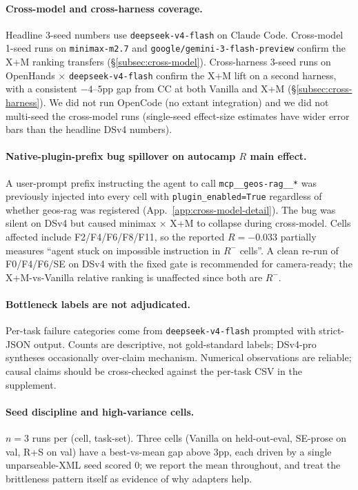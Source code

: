 \documentclass{article}
\begin{document}
\paragraph{Cross-model and cross-harness coverage.}
Headline 3-seed numbers use \texttt{deepseek-v4-flash} on Claude Code. Cross-model 1-seed runs on \texttt{minimax-m2.7} and \texttt{google/gemini-3-flash-preview} confirm the X+M ranking transfers (\S\ref{subsec:cross-model}). Cross-harness 3-seed runs on OpenHands × \texttt{deepseek-v4-flash} confirm the X+M lift on a second harness, with a consistent $-4$--$5$pp gap from CC at both Vanilla and X+M (\S\ref{subsec:cross-harness}). We did not run OpenCode (no extant integration) and we did not multi-seed the cross-model runs (single-seed effect-size estimates have wider error bars than the headline DSv4 numbers).

\paragraph{Native-plugin-prefix bug spillover on autocamp $R$ main effect.}
A user-prompt prefix instructing the agent to call \texttt{mcp\_\_geos-rag\_\_*} was previously injected into every cell with \texttt{plugin\_enabled=True} regardless of whether geos-rag was registered (App.~\ref{app:cross-model-detail}). The bug was silent on DSv4 but caused minimax × X+M to collapse during cross-model. Cells affected include F2/F4/F6/F8/F11, so the reported $R = -0.033$ partially measures ``agent stuck on impossible instruction in $R^{-}$ cells''. A clean re-run of F0/F4/F6/SE on DSv4 with the fixed gate is recommended for camera-ready; the X+M-vs-Vanilla relative ranking is unaffected since both are $R^{-}$.

\paragraph{Bottleneck labels are not adjudicated.}
Per-task failure categories come from \texttt{deepseek-v4-flash} prompted with strict-JSON output. Counts are descriptive, not gold-standard labels; DSv4-pro syntheses occasionally over-claim mechanism. Numerical observations are reliable; causal claims should be cross-checked against the per-task CSV in the supplement.

\paragraph{Seed discipline and high-variance cells.}
$n=3$ runs per (cell, task-set). Three cells (Vanilla on held-out-eval, SE-prose on val, R+S on val) have a best-vs-mean gap above 3pp, each driven by a single unparseable-XML seed scored 0; we report the mean throughout, and treat the brittleness pattern itself as evidence of why adapters help.
\end{document}
